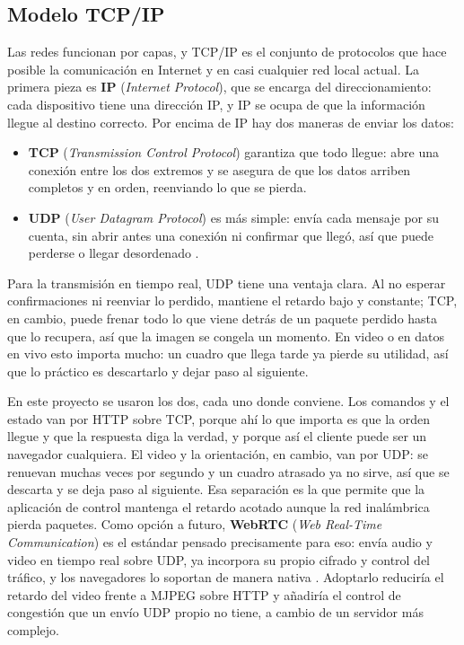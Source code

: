 \documentclass[journal]{IEEEtran}
\begin{document}
\subsection{Modelo TCP/IP}

Las redes funcionan por capas, y TCP/IP es el conjunto de protocolos que hace posible la comunicación en Internet y en casi cualquier red local actual. La primera pieza es \textbf{IP} (\emph{Internet Protocol}), que se encarga del direccionamiento: cada dispositivo tiene una dirección IP, y IP se ocupa de que la información llegue al destino correcto. Por encima de IP hay dos maneras de enviar los datos:

\begin{itemize}
\item \textbf{TCP} (\emph{Transmission Control Protocol}) garantiza que todo llegue: abre una conexión entre los dos extremos y se asegura de que los datos arriben completos y en orden, reenviando lo que se pierda.
\item \textbf{UDP} (\emph{User Datagram Protocol}) es más simple: envía cada mensaje por su cuenta, sin abrir antes una conexión ni confirmar que llegó, así que puede perderse o llegar desordenado \cite{rfc768}.
\end{itemize}

Para la transmisión en tiempo real, UDP tiene una ventaja clara. Al no esperar confirmaciones ni reenviar lo perdido, mantiene el retardo bajo y constante; TCP, en cambio, puede frenar todo lo que viene detrás de un paquete perdido hasta que lo recupera, así que la imagen se congela un momento. En video o en datos en vivo esto importa mucho: un cuadro que llega tarde ya pierde su utilidad, así que lo práctico es descartarlo y dejar paso al siguiente.

En este proyecto se usaron los dos, cada uno donde conviene. Los comandos y el estado van por HTTP sobre TCP, porque ahí lo que importa es que la orden llegue y que la respuesta diga la verdad, y porque así el cliente puede ser un navegador cualquiera. El video y la orientación, en cambio, van por UDP: se renuevan muchas veces por segundo y un cuadro atrasado ya no sirve, así que se descarta y se deja paso al siguiente. Esa separación es la que permite que la aplicación de control mantenga el retardo acotado aunque la red inalámbrica pierda paquetes. Como opción a futuro, \textbf{WebRTC} (\emph{Web Real-Time Communication}) es el estándar pensado precisamente para eso: envía audio y video en tiempo real sobre UDP, ya incorpora su propio cifrado y control del tráfico, y los navegadores lo soportan de manera nativa \cite{rfc8825}. Adoptarlo reduciría el retardo del video frente a MJPEG sobre HTTP y añadiría el control de congestión que un envío UDP propio no tiene, a cambio de un servidor más complejo.
\end{document}
